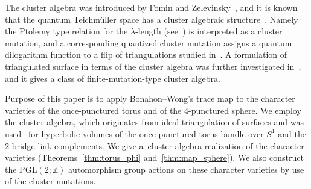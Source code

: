 \documentclass[pdftex]{sigma}
\numberwithin{equation}{section}
\begin{document}
The cluster algebra was introduced by Fomin and Zelevinsky~\cite{FominZelev02a}, and it is known that the quantum Teichm{\"u}ller space has a cluster algebraic structure~\cite{FockGonc06b,GekhShapVain05a}. Namely
the Ptolemy type relation for the $\lambda$-length (see~\cite{Penner12}) is interpreted as a cluster mutation, and a corresponding quantized cluster mutation assigns a quantum dilogarithm function to a flip of triangulations studied in~\cite{Kasha98a}. A formulation of triangulated surface in terms of the cluster algebra was further investigated in~\cite{FomiShapThur08a}, and it gives a class of finite-mutation-type cluster algebra.

Purpose of this paper is to apply Bonahon--Wong's trace map to the character varieties of the once-punctured torus and of the $4$-punctured sphere. We employ the cluster algebra, which originates from ideal triangulation of surfaces and was used~\cite{HikamiRInoue12a} for hyperbolic volumes of the once-punctured torus bundle over $S^1$ and the $2$-bridge link complements. We give a~cluster algebra realization of the character varieties (Theorems~\ref{thm:torus_phi} and~\ref{thm:map_sphere}). We also construct the $\mathrm{PGL}(2;\mathbb{Z})$ automorphism group actions on these character varieties by use of the cluster mutations.
\end{document}
